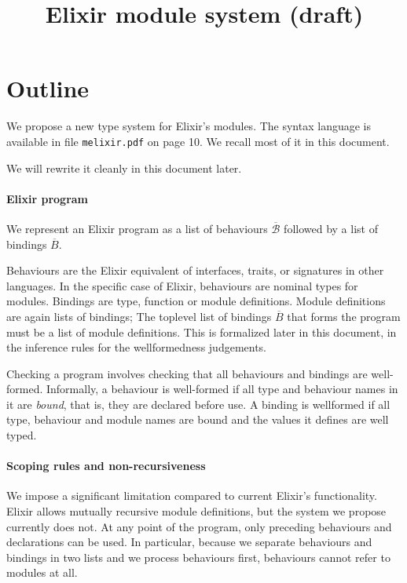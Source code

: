 \documentclass[12pt]{article}
\begin{document}
\title{Elixir module system (draft)}
\date{}
\maketitle

\section{Outline}

We propose a new type system for Elixir's modules.
The syntax language is available in file \texttt{melixir.pdf} on page 10.
We recall most of it in this document.

We will rewrite it cleanly in this document later.

\paragraph{Elixir program}

We represent an Elixir program as a list of behaviours $\overline{\mathcal{B}}$ followed by a
list of bindings $\overline{B}$.

Behaviours are the Elixir equivalent of interfaces, traits, or signatures in other languages. In the specific case of Elixir, behaviours are nominal types for modules.
Bindings are type, function or module definitions. Module definitions are again lists of bindings;
The toplevel list of bindings $\overline{B}$ that forms the program  must be a list of module definitions.
This is formalized later in this document, in the inference rules for the wellformedness judgements.

Checking a program involves checking that all behaviours and bindings are well-formed.
Informally, a behaviour is well-formed if all type and behaviour names in it are \textit{bound},
that is, they are declared before use. A binding is wellformed if all type, behaviour and module
names are bound and the values it defines are well typed.

\paragraph{Scoping rules and non-recursiveness}

We impose a significant limitation compared to current Elixir's functionality.
Elixir allows mutually recursive module definitions, but the system we propose
currently does not. At any point of the program, only preceding behaviours
and declarations can be used. In particular, because we separate behaviours and bindings
in two lists and we process behaviours first, behaviours cannot refer to modules at all.
\end{document}
